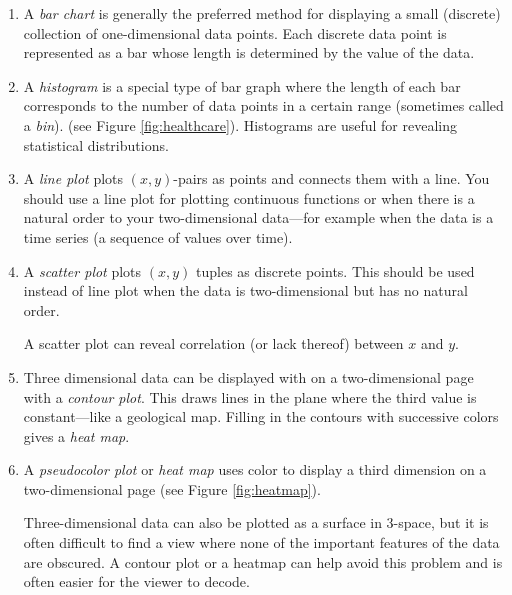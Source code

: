 \begin{enumerate}
\item A \emph{bar chart} is generally the preferred method for displaying a small (discrete) collection of one-dimensional data points. Each discrete data point is represented as a bar whose length is determined by the value of the data.

\item A \emph{histogram} is a special type of  bar graph where the length of each bar corresponds to the number of data points in a certain range (sometimes called a \emph{bin}). 
(see Figure \ref{fig:healthcare}). 
Histograms are useful for revealing statistical distributions.


\item A \emph{line plot} plots $(x,y)$-pairs as points and connects them with a line. 
You should use a line plot for plotting continuous functions or when there is a natural order to your two-dimensional data---for example when the data is a time series (a sequence of values over time). 

\item A \emph{scatter plot} plots $(x,y)$ tuples as discrete points.  This should be used instead of line plot when the data is two-dimensional but has no natural order. 
 
A scatter plot can reveal correlation (or lack thereof) between $x$ and $y$. 



\item Three dimensional data can be displayed with on a two-dimensional page with a \emph{contour plot}.  This draws lines in the plane where the third value is constant---like a geological map.  Filling in the contours with successive colors gives a  \emph{heat map}.

\item A \emph{pseudocolor plot} or \emph{heat map} uses color to display a third dimension on a two-dimensional page (see Figure \ref{fig:heatmap}). 


Three-dimensional data can also be plotted as a surface in 3-space, but it is often difficult to find a view where none of the important features of the data are obscured.
A contour plot or a heatmap can help avoid this problem and is often easier for the viewer to decode.



\end{enumerate}

